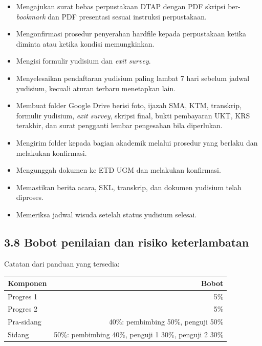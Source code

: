 \documentclass[
  indonesian,
  11pt,
]{article}
\newcounter{none} %
\providecommand{\tightlist}{%
  \setlength{\itemsep}{0pt}\setlength{\parskip}{0pt}}
\renewcommand{\tightlist}{%
  \setlength{\itemsep}{0.22em}%
  \setlength{\parskip}{0pt}%
}
\begin{document}
\begin{itemize}
\tightlist
\item[$\square$]
  Mengajukan surat bebas perpustakaan DTAP dengan PDF skripsi
  ber-\emph{bookmark} dan PDF presentasi sesuai instruksi perpustakaan.
\item[$\square$]
  Mengonfirmasi prosedur penyerahan hardfile kepada perpustakaan ketika
  diminta atau ketika kondisi memungkinkan.
\item[$\square$]
  Mengisi formulir yudisium dan \emph{exit survey}.
\item[$\square$]
  Menyelesaikan pendaftaran yudisium paling lambat 7 hari sebelum jadwal
  yudisium, kecuali aturan terbaru menetapkan lain.
\item[$\square$]
  Membuat folder Google Drive berisi foto, ijazah SMA, KTM, transkrip,
  formulir yudisium, \emph{exit survey}, skripsi final, bukti pembayaran
  UKT, KRS terakhir, dan surat pengganti lembar pengesahan bila
  diperlukan.
\item[$\square$]
  Mengirim folder kepada bagian akademik melalui prosedur yang berlaku
  dan melakukan konfirmasi.
\item[$\square$]
  Mengunggah dokumen ke ETD UGM dan melakukan konfirmasi.
\item[$\square$]
  Memastikan berita acara, SKL, transkrip, dan dokumen yudisium telah
  diproses.
\item[$\square$]
  Memeriksa jadwal wisuda setelah status yudisium selesai.
\end{itemize}

\subsection{3.8 Bobot penilaian dan risiko
keterlambatan}\label{bobot-penilaian-dan-risiko-keterlambatan}

Catatan dari panduan yang tersedia:

{\def\LTcaptype{none} %
\begin{longtable}[]{@{}lr@{}}
\toprule\noalign{}
Komponen & Bobot \\
\midrule\noalign{}
\endhead
\bottomrule\noalign{}
\endlastfoot
Progres 1 & 5\% \\
Progres 2 & 5\% \\
Pra-sidang & 40\%: pembimbing 50\%, penguji 50\% \\
Sidang & 50\%: pembimbing 40\%, penguji 1 30\%, penguji 2 30\% \\
\end{longtable}
}
\end{document}
